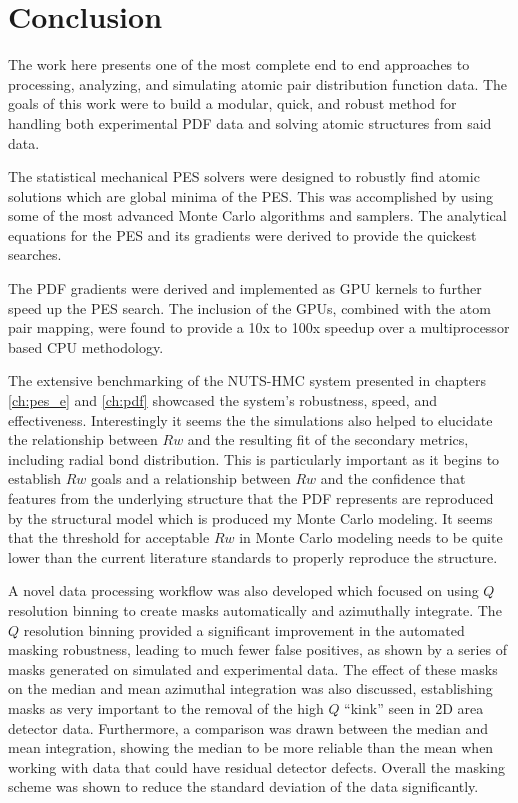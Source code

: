 \chapter{Conclusion}
The work here presents one of the most complete end to end approaches to processing, analyzing, and simulating atomic pair distribution function data.
The goals of this work were to build a modular, quick, and robust method for handling both experimental PDF data and solving atomic structures from said data.

The statistical mechanical PES solvers were designed to robustly find atomic solutions which are global minima of the PES.
This was accomplished by using some of the most advanced Monte Carlo algorithms and samplers.
The analytical equations for the PES and its gradients were derived to provide the quickest searches.

The PDF gradients were derived and implemented as GPU kernels to further speed up the PES search.
The inclusion of the GPUs, combined with the atom pair mapping, were found to provide a 10x to 100x speedup over a multiprocessor based CPU methodology.

The extensive benchmarking of the NUTS-HMC system presented in chapters \ref{ch:pes_e} and \ref{ch:pdf} showcased the system's robustness, speed, and effectiveness.
Interestingly it seems the the simulations also helped to elucidate the relationship between $Rw$ and the resulting fit of the secondary metrics, including radial bond distribution.
This is particularly important as it begins to establish $Rw$ goals and a relationship between $Rw$ and the confidence that features from the underlying structure that the PDF represents are reproduced by the structural model which is produced my Monte Carlo modeling.
It seems that the threshold for acceptable $Rw$ in Monte Carlo modeling needs to be quite lower than the current literature standards to properly reproduce the structure.

A novel data processing workflow was also developed which focused on using $Q$ resolution binning to create masks automatically and azimuthally integrate.
The $Q$ resolution binning provided a significant improvement in the automated masking robustness, leading to much fewer false positives, as shown by a series of masks generated on simulated and experimental data.
The effect of these masks on the median and mean azimuthal integration was also discussed, establishing masks as very important to the removal of the high $Q$ ``kink'' seen in 2D area detector data.
Furthermore, a comparison was drawn between the median and mean integration, showing the median to be more reliable than the mean when working with data that could have residual detector defects.
Overall the masking scheme was shown to reduce the standard deviation of the data significantly.

